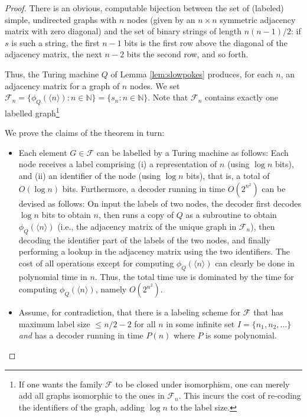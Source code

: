 \documentclass{article}
\newcommand{\bincode}[1]{\ensuremath{\langle #1 \rangle}}
\begin{document}
\begin{proof}
There is an obvious, computable bijection between the set of (labeled) simple, undirected graphs 
with $n$ nodes (given by an $n \times n$ symmetric adjacency matrix with zero diagonal) and the set of binary strings of length $n(n-1)/2$: if $s$ is such a string, the first $n-1$ bits is the first row above the diagonal of the adjacency matrix, the next $n-2$ bits the second row, and so forth.

Thus, the Turing machine $Q$ of Lemma \ref{lem:slowpokes} produces, for each $n$, an adjacency matrix
for a graph of $n$ nodes. We set $\mathcal{F}_n = \{\phi_Q(\bincode{n}) : n \in \mathbb{N}\} = \{s_n : n \in \mathbb{N}\}$. Note that
$\mathcal{F}_n$ contains exactly one labelled graph\footnote{If one wants the family $\mathcal{F}$ to be closed
under isomorphism, one can merely add all graphs isomorphic to the ones in $\mathcal{F}_n$. This incurs the cost of re-coding the identifiers of the graph, adding $\log n$ to the label size.}

We prove the claims of the theorem in turn:

\begin{itemize}

\item Each element $G \in \mathcal{F}$ can be labelled by a Turing machine as follows: Each node receives
a label comprising (i) a representation of $n$ (using $\log n$ bits), and (ii) an identifier of the node (using $\log n$ bits),
that is, a total of $O(\log n)$ bits.
Furthermore, a decoder running in time $O(2^{n^2})$ can be devised as follows: On input the labels of two
nodes, the decoder first decodes $\log n$ bits to obtain $n$, then runs a copy of $Q$ as a subroutine
to obtain $\phi_{Q}(\bincode{n})$ (i.e., the adjacency matrix of the unique graph in $\mathcal{F}_n$),
then decoding the identifier part of the labels of the two nodes, and finally performing a lookup in the adjacency matrix using the two identifiers. The cost of all operations except for computing $\phi_{Q}(\bincode{n})$ can clearly
be done in polynomial time in $n$. Thus, the total time use is dominated by the time for computing  $\phi_{Q}(\bincode{n})$, namely $O(2^{n^2})$.

\item Assume, for contradiction, that there is a labeling scheme for $\mathcal{F}$ that has maximum
label size $\leq n/2 - 2$ for all $n$ in some infinite set $I = \{n_1,n_2,\ldots\}$ \emph{and} has a decoder running in time $P(n)$ where $P$ is some polynomial. 


\end{itemize}
\end{proof}
\end{document}
